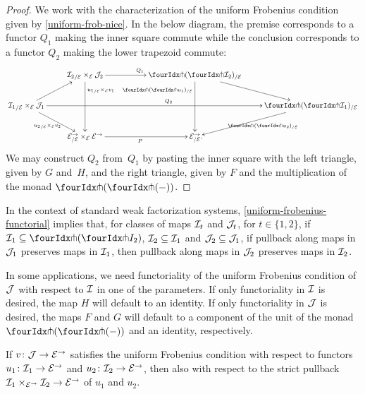 \documentclass[reqno,10pt,a4paper,oneside,draft]{amsart}
\begin{document}
\begin{proof}
We work with the characterization of the uniform Frobenius condition given by \cref{uniform-frob-nice}.
In the below diagram, the premise corresponds to a functor $Q_1$ making the inner square commute while the conclusion corresponds to a functor $Q_2$ making the lower trapezoid commute:
\[
\xymatrix{
&
  {\cal{I}_2}_{/\cal{E}} \times_{\cal{E}} \cal{J}_2
  \ar[rr]^{Q_1}
  \ar[dd]^(0.25){{u_1}_{/\cal{E}} \times_{\cal{E}} v_1}
&&
  \liftl{(\liftr{\cal{I}_2})}_{/\cal{E}}
  \ar[dr]
  \ar[dd]_(0.25){\liftl{(\liftr{u_1})}_{/\cal{E}}}
\\
  {\cal{I}_1}_{/\cal{E}} \times_{\cal{E}} \cal{J}_1
  \ar[ur]
  \ar[dr]_{{u_2}_{/\cal{E}} \times_{\cal{E}} v_2}
  \ar[rrrr]^{Q_2}
&&&&
  \liftl{(\liftr{\cal{I}_1})}_{/\cal{E}}
  \ar[dl]^{\liftl{(\liftr{u_2})}_{/\cal{E}}}
\\&
  \cal{E}^\to_{/\cal{E}} \times_{\cal{E}} \cal{E}^\to
  \ar[rr]_{P}
&&
  \cal{E}^\to_{/\cal{E}}
\rlap{.}}
\]
We may construct $Q_2$ from~$Q_1$ by pasting the inner square with the left triangle, given by $G$ and~$H$, and the right triangle, given by $F$ and the multiplication of the monad $\liftl{(\liftr{(-)})}$.
\end{proof}

In the context of standard weak factorization systems, \cref{uniform-frobenius-functorial} implies that,
for classes of maps $\cal{I}_t$ and $\cal{J}_t$, for $t \in \{ 1, 2 \}$, if $\cal{I}_1 \subseteq \liftl{(\liftr{I_2})}$,
$\cal{I}_2 \subseteq \cal{I}_1$ and $\cal{J}_2 \subseteq \cal{J}_1$, if pullback along maps in $\cal{J}_1$
preserves maps in $\cal{I}_1$, then pullback along maps in $\cal{J}_2$ preserves maps in $\cal{I}_2$. 


\begin{remark} 
 In some applications, we need functoriality of the uniform Frobenius condition of $\cal{J}$ with respect to $\cal{I}$ in one of the parameters.
If only functoriality in $\cal{I}$ is desired, the map $H$ will default to an identity.
If only functoriality in $\cal{J}$ is desired, the maps $F$ and $G$ will default to a component of the unit of the monad $\liftl{(\liftr{(-)})}$ and an identity, respectively.
\end{remark} 

\begin{proposition} \label{uniform-frobenius-product-u}
If $v \co \cal{J} \to \cal{E}^\to$ satisfies the uniform Frobenius condition with respect to functors $u_1 \co \cal{I}_1 \to \cal{E}^\to$ and $u_2 \co \cal{I}_2 \to \cal{E}^\to$, then also with respect to the strict pullback $\cal{I}_1 \times_{\cal{E}^\to} \cal{I}_2 \to \cal{E}^\to$ of $u_1$ and $u_2$.
\end{proposition}
\end{document}
